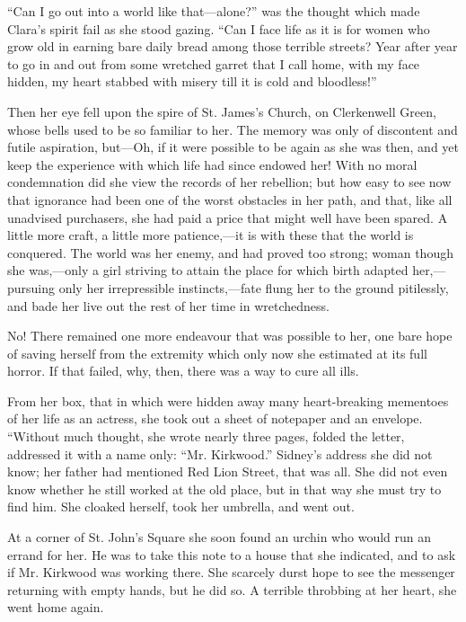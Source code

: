 ``Can I go out into a world like that---alone?'' was the thought which
made Clara's spirit fail as she stood gazing. ``Can I face life as it is
for women who grow old in earning bare daily bread among those terrible
streets? Year after year to go in and out from some wretched garret that
I call home, with my face hidden, my heart stabbed with misery till it
is cold and bloodless!''

Then her eye fell upon the spire of St. James's Church, on Clerkenwell
Green, whose bells used to be so familiar to her. The
{\protect\hypertarget{74}{}{}}memory was only of discontent and futile
aspiration, but---Oh, if it were possible to be again as she was then,
and yet keep the experience with which life had since endowed her! With
no moral condemnation did she view the records of her rebellion; but how
easy to see now that ignorance had been one of the worst obstacles in
her path, and that, like all unadvised purchasers, she had paid a price
that might well have been spared. A little more craft, a little more
patience,---it is with these that the world is conquered. The world was
her enemy, and had proved too strong; woman though she was,---only a
girl striving to attain the place for which birth adapted
her,---pursuing only her irrepressible instincts,---fate flung her to
the ground pitilessly, and bade her live out the rest of her time in
wretchedness.

No! There remained one more endeavour that was possible to her, one bare
hope of saving herself from the extremity which only now she estimated
at its full horror. If that failed, why, then, there was a way to cure
all ills.

From her box, that in which were hidden away many heart-breaking
mementoes of her life as an actress, she took out a sheet of
{\protect\hypertarget{75}{}{}}notepaper and an envelope. ``Without much
thought, she wrote nearly three pages, folded the letter, addressed it
with a name only: ``Mr. Kirkwood.'' Sidney's address she did not know;
her father had mentioned Red Lion Street, that was all. She did not even
know whether he still worked at the old place, but in that way she must
try to find him. She cloaked herself, took her umbrella, and went out.

At a corner of St. John's Square she soon found an urchin who would run
an errand for her. He was to take this note to a house that she
indicated, and to ask if Mr. Kirkwood was working there. She scarcely
durst hope to see the messenger returning with empty hands, but he did
so. A terrible throbbing at her heart, she went home again.

